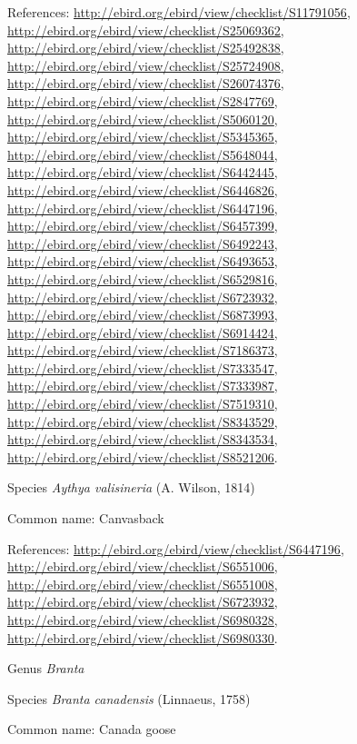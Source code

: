 \documentclass[9pt, article]{memoir}
\begin{document}
\begin{multicols}{2}
References: 
\url{http://ebird.org/ebird/view/checklist/S11791056}, 
\url{http://ebird.org/ebird/view/checklist/S25069362}, 
\url{http://ebird.org/ebird/view/checklist/S25492838}, 
\url{http://ebird.org/ebird/view/checklist/S25724908}, 
\url{http://ebird.org/ebird/view/checklist/S26074376}, 
\url{http://ebird.org/ebird/view/checklist/S2847769}, 
\url{http://ebird.org/ebird/view/checklist/S5060120}, 
\url{http://ebird.org/ebird/view/checklist/S5345365}, 
\url{http://ebird.org/ebird/view/checklist/S5648044}, 
\url{http://ebird.org/ebird/view/checklist/S6442445}, 
\url{http://ebird.org/ebird/view/checklist/S6446826}, 
\url{http://ebird.org/ebird/view/checklist/S6447196}, 
\url{http://ebird.org/ebird/view/checklist/S6457399}, 
\url{http://ebird.org/ebird/view/checklist/S6492243}, 
\url{http://ebird.org/ebird/view/checklist/S6493653}, 
\url{http://ebird.org/ebird/view/checklist/S6529816}, 
\url{http://ebird.org/ebird/view/checklist/S6723932}, 
\url{http://ebird.org/ebird/view/checklist/S6873993}, 
\url{http://ebird.org/ebird/view/checklist/S6914424}, 
\url{http://ebird.org/ebird/view/checklist/S7186373}, 
\url{http://ebird.org/ebird/view/checklist/S7333547}, 
\url{http://ebird.org/ebird/view/checklist/S7333987}, 
\url{http://ebird.org/ebird/view/checklist/S7519310}, 
\url{http://ebird.org/ebird/view/checklist/S8343529}, 
\url{http://ebird.org/ebird/view/checklist/S8343534}, 
\url{http://ebird.org/ebird/view/checklist/S8521206}.

\vspace{6pt}\noindent\hspace{36pt}Species \textit{Aythya valisineria} (A. Wilson, 1814)


Common name: Canvasback

References: 
\url{http://ebird.org/ebird/view/checklist/S6447196}, 
\url{http://ebird.org/ebird/view/checklist/S6551006}, 
\url{http://ebird.org/ebird/view/checklist/S6551008}, 
\url{http://ebird.org/ebird/view/checklist/S6723932}, 
\url{http://ebird.org/ebird/view/checklist/S6980328}, 
\url{http://ebird.org/ebird/view/checklist/S6980330}.

\vspace{6pt}\noindent\hspace{30pt}Genus \textit{Branta}


\vspace{6pt}\noindent\hspace{36pt}Species \textit{Branta canadensis} (Linnaeus, 1758)


Common name: Canada goose


\end{multicols}
\end{document}
